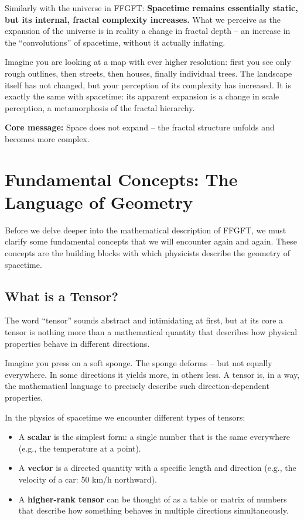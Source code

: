 Similarly with the universe in FFGFT: \textbf{Spacetime remains essentially static, but its internal, fractal complexity increases.} What we perceive as the expansion of the universe is in reality a change in fractal depth -- an increase in the ``convolutions'' of spacetime, without it actually inflating.

Imagine you are looking at a map with ever higher resolution: first you see only rough outlines, then streets, then houses, finally individual trees. The landscape itself has not changed, but your perception of its complexity has increased. It is exactly the same with spacetime: its apparent expansion is a change in scale perception, a metamorphosis of the fractal hierarchy.

\textbf{Core message:} Space does not expand -- the fractal structure unfolds and becomes more complex.

\section{Fundamental Concepts: The Language of Geometry}

Before we delve deeper into the mathematical description of FFGFT, we must clarify some fundamental concepts that we will encounter again and again. These concepts are the building blocks with which physicists describe the geometry of spacetime.

\subsection{What is a Tensor?}

The word ``tensor'' sounds abstract and intimidating at first, but at its core a tensor is nothing more than a mathematical quantity that describes how physical properties behave in different directions.

Imagine you press on a soft sponge. The sponge deforms -- but not equally everywhere. In some directions it yields more, in others less. A tensor is, in a way, the mathematical language to precisely describe such direction-dependent properties.

In the physics of spacetime we encounter different types of tensors:
\begin{itemize}[leftmargin=*]
\item A \textbf{scalar} is the simplest form: a single number that is the same everywhere (e.g., the temperature at a point).
\item A \textbf{vector} is a directed quantity with a specific length and direction (e.g., the velocity of a car: 50 km/h northward).
\item A \textbf{higher-rank tensor} can be thought of as a table or matrix of numbers that describe how something behaves in multiple directions simultaneously.
\end{itemize}

